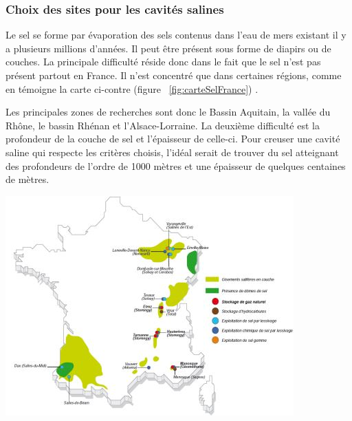 \documentclass[11pt,french,a4paper]{article}
\begin{document}
\subsubsection{Choix des sites pour les cavités salines}

\begin{multicols}{2}
Le sel se forme par évaporation des sels contenus dans l’eau de mers existant il y a plusieurs millions d’années. Il peut être présent sous forme de diapirs ou de couches.
La principale difficulté réside donc dans le fait que le sel n’est pas présent partout en France. Il n’est concentré que dans certaines régions, comme en témoigne la carte ci-contre (figure ~\ref{fig:carteSelFrance}) \cite{Hadj_Hassen_Jallais_2020}.

Les principales zones de recherches sont donc le Bassin Aquitain, la vallée du Rhône, le bassin Rhénan et l’Alsace-Lorraine. 
La deuxième difficulté est la profondeur de la couche de sel et l’épaisseur de celle-ci. Pour creuser une cavité saline qui respecte les critères choisis, l’idéal serait de trouver du sel atteignant des profondeurs de l’ordre de 1000 mètres et une épaisseur de quelques centaines de mètres.


\begin{center}
\includegraphics[width=.95\linewidth]{image/chap4/IV.4.ii.jpg}
\label{fig:carteSelFrance}
\end{center}

\end{multicols}
\end{document}
